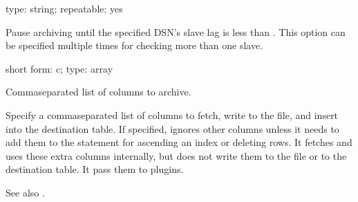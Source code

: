\documentclass[letterpaper,10pt,english]{sphinxmanual}
\begin{document}

\begin{fulllineitems}
\label{\detokenize{mariadb-archiver:cmdoption-mariadb-archiver-check-slave-lag}}
\sphinxAtStartPar
type: string; repeatable: yes

\sphinxAtStartPar
Pause archiving until the specified DSN’s slave lag is less than {\hyperref[\detokenize{mariadb-archiver:cmdoption-mariadb-archiver-max-lag}]{}}.
This option can be specified multiple times for checking more than one slave.

\end{fulllineitems}


\begin{fulllineitems}
\label{\detokenize{mariadb-archiver:cmdoption-mariadb-archiver-columns}}
\sphinxAtStartPar
short form: \sphinxhyphen{}c; type: array

\sphinxAtStartPar
Comma\sphinxhyphen{}separated list of columns to archive.

\sphinxAtStartPar
Specify a comma\sphinxhyphen{}separated list of columns to fetch, write to the file, and
insert into the destination table.  If specified,  ignores other
columns unless it needs to add them to the  statement for ascending an
index or deleting rows.  It fetches and uses these extra columns internally, but
does not write them to the file or to the destination table.  It  pass
them to plugins.

\sphinxAtStartPar
See also {\hyperref[\detokenize{mariadb-archiver:cmdoption-mariadb-archiver-primary-key-only}]{}}.

\end{fulllineitems}
\end{document}
